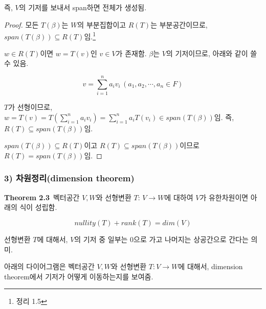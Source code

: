 즉, $V$의 기저를 보내서 span하면 전체가 생성됨.

\begin{proof}
모든 $T(\beta)$는 $W$의 부분집합이고 $R(T)$는 부분공간이므로, $span(T(\beta)) \subseteq R(T)임.$\footnote{정리 1.5}

$w \in R(T)$이면 $w=T(v)$인 $v \in V$가 존재함. $\beta$는 $V$의 기저이므로, 아래와 같이 쓸 수 있음.

\[
v= \sum_{i=1}^{n}{a_i v_i}\,(a_1,a_2, \cdots ,a_n \in F)
\]

$T$가 선형이므로, $w=T(v)=T(\sum_{i=1}^{n}{a_i v_i})=\sum_{i=1}^{n}{a_i T(v_i)} \in span(T(\beta))$임. 즉, $R(T) \subseteq span(T(\beta))$임.

$span(T(\beta)) \subseteq R(T)$이고 $R(T) \subseteq span(T(\beta))$이므로 $R(T) = span(T(\beta))$임.
\end{proof}


\newpage


\subsubsection*{3) 차원정리(dimension theorem)}
\textbf{Theorem 2.3}\, 벡터공간 $V,W$와 선형변환 $T:\,V \rightarrow W$에 대하여 $V$가 유한차원이면 아래의 식이 성립함.

\[
nullity(T)+rank(T)=dim(V)
\]

선형변환 $T$에 대해서, $V$의 기저 중 일부는 0으로 가고 나머지는 상공간으로 간다는 의미.

아래의 다이어그램은 벡터공간 $V,W$와 선형변환 $T:V \rightarrow W$에 대해서, dimension theorem에서 기저가 어떻게 이동하는지를 보여줌.


